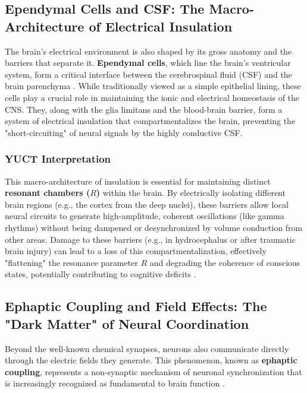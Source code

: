 \documentclass[12pt,a4paper]{article}
\begin{document}
	\subsection{Ependymal Cells and CSF: The Macro-Architecture of Electrical Insulation}
	
	The brain's electrical environment is also shaped by its gross anatomy and the barriers that separate it. \textbf{Ependymal cells}, which line the brain's ventricular system, form a critical interface between the cerebrospinal fluid (CSF) and the brain parenchyma \cite{DelBigio2010}. While traditionally viewed as a simple epithelial lining, these cells play a crucial role in maintaining the ionic and electrical homeostasis of the CNS. They, along with the glia limitans and the blood-brain barrier, form a system of electrical insulation that compartmentalizes the brain, preventing the "short-circuiting" of neural signals by the highly conductive CSF.
	
	\subsubsection*{YUCT Interpretation}
	This macro-architecture of insulation is essential for maintaining distinct \textbf{resonant chambers (\(R\))} within the brain. By electrically isolating different brain regions (e.g., the cortex from the deep nuclei), these barriers allow local neural circuits to generate high-amplitude, coherent oscillations (like gamma rhythms) without being dampened or desynchronized by volume conduction from other areas. Damage to these barriers (e.g., in hydrocephalus or after traumatic brain injury) can lead to a loss of this compartmentalization, effectively "flattening" the resonance parameter \(R\) and degrading the coherence of conscious states, potentially contributing to cognitive deficits \cite{Krishnamurthy2012}.
	
	\subsection{Ephaptic Coupling and Field Effects: The "Dark Matter" of Neural Coordination}
	
	Beyond the well-known chemical synapses, neurons also communicate directly through the electric fields they generate. This phenomenon, known as \textbf{ephaptic coupling}, represents a non-synaptic mechanism of neuronal synchronization that is increasingly recognized as fundamental to brain function \cite{Jefferys1995, Anastassiou2011}.
	
\end{document}

